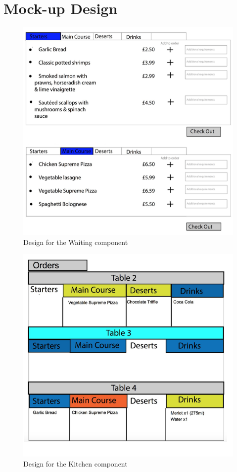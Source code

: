 \documentclass[11pt, a4paper]{report}
\begin{document}
\section{Mock-up Design}
\begin{figure}
\centering
\includegraphics[scale=0.65]{Figures/WaitStaffApp.png}
\caption{Design for the Waiting component}
\end{figure}
\begin{figure}
\centering
\includegraphics[scale=0.65]{Figures/KitchenDisplay.png}
\caption{Design for the Kitchen component}
\end{figure}
\end{document}
